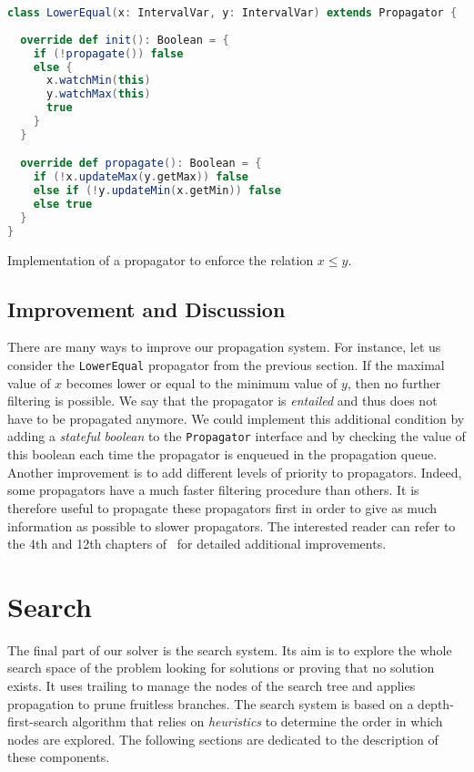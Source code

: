\documentclass{llncs}
\begin{document}
\begin{code}
\begin{lstlisting}[language=scala,style=lineNumber]
class LowerEqual(x: IntervalVar, y: IntervalVar) extends Propagator {
  
  override def init(): Boolean = {
    if (!propagate()) false
    else {
      x.watchMin(this)
      y.watchMax(this)
      true
    }
  }

  override def propagate(): Boolean = {
    if (!x.updateMax(y.getMax)) false
    else if (!y.updateMin(x.getMin)) false
    else true
  }
}
\end{lstlisting}
\caption{Implementation of a propagator to enforce the relation $x \leq y$.}
\label{code:leq}
\end{code}

\subsection{Improvement and Discussion}

There are many ways to improve our propagation system. 
For instance, let us consider the \texttt{LowerEqual} propagator from the previous section. 
If the maximal value of $x$ becomes lower or equal to the minimum value of $y$, then no further filtering is possible.
We say that the propagator is \emph{entailed} and thus does not have to be propagated anymore. 
We could implement this additional condition by adding a \emph{stateful boolean} to the \texttt{Propagator} interface and by checking the value of this boolean each time the propagator is enqueued in the propagation queue. 
Another improvement is to add different levels of priority to propagators.
Indeed, some propagators have a much faster filtering procedure than others. 
It is therefore useful to propagate these propagators first in order to give as much information as possible to slower propagators. 
The interested reader can refer to the 4th and 12th chapters of~\cite{handbook} for detailed additional improvements. 

\section{Search}
\label{sec:kiwisearch}

The final part of our solver is the search system. 
Its aim is to explore the whole search space of the problem looking for solutions or proving that no solution exists. 
It uses trailing to manage the nodes of the search tree and applies propagation to prune fruitless branches. 
The search system is based on a depth-first-search algorithm that relies on \emph{heuristics} to determine the order in which nodes are explored.
The following sections are dedicated to the description of these components. 
\end{document}
